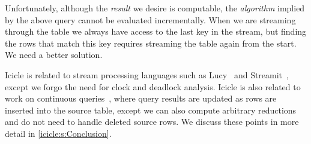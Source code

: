 Unfortunately, although the \emph{result} we desire is computable, the \emph{algorithm} implied by the above query cannot be evaluated incrementally.
When we are streaming through the table we always have access to the last key in the stream, but finding the rows that match this key requires streaming the table again from the start.
We need a better solution.


Icicle is related to stream processing languages such as Lucy~\cite{mandel2010lucy} and Streamit~\cite{thies2002streamit}, except we forgo the need for clock and deadlock analysis.
Icicle is also related to work on continuous queries~\cite{arasu2003cql}, where query results are updated as rows are inserted into the source table, except we can also compute arbitrary reductions and do not need to handle deleted source rows.
We discuss these points in more detail in \cref{icicle:s:Conclusion}.
